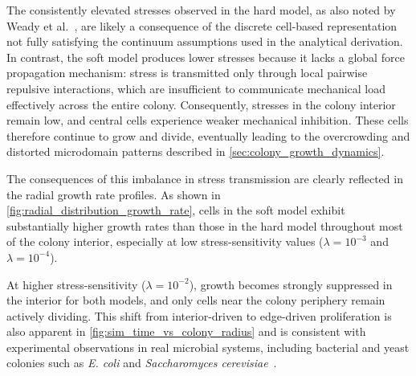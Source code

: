 \documentclass[conference]{IEEEtran}
\begin{document}
The consistently elevated stresses observed in the hard model, as also noted by Weady et al.~\cite{Weady2024}, are likely a consequence of the discrete cell-based representation not fully satisfying the continuum assumptions used in the analytical derivation. In contrast, the soft model produces lower stresses because it lacks a global force propagation mechanism: stress is transmitted only through local pairwise repulsive interactions, which are insufficient to communicate mechanical load effectively across the entire colony. Consequently, stresses in the colony interior remain low, and central cells experience weaker mechanical inhibition. These cells therefore continue to grow and divide, eventually leading to the overcrowding and distorted microdomain patterns described in \autoref{sec:colony_growth_dynamics}.

The consequences of this imbalance in stress transmission are clearly reflected in the radial growth rate profiles. As shown in \autoref{fig:radial_distribution_growth_rate}, cells in the soft model exhibit substantially higher growth rates than those in the hard model throughout most of the colony interior, especially at low stress-sensitivity values ($\lambda = 10^{-3}$ and $\lambda = 10^{-4}$).

At higher stress-sensitivity ($\lambda = 10^{-2}$), growth becomes strongly suppressed in the interior for both models, and only cells near the colony periphery remain actively dividing. This shift from interior-driven to edge-driven proliferation is also apparent in \autoref{fig:sim_time_vs_colony_radius} and is consistent with experimental observations in real microbial systems, including bacterial and yeast colonies such as \textit{E. coli} and \textit{Saccharomyces cerevisiae}~\cite{Warren2019,Hallatschek2007,Giometto2018}.
\end{document}
